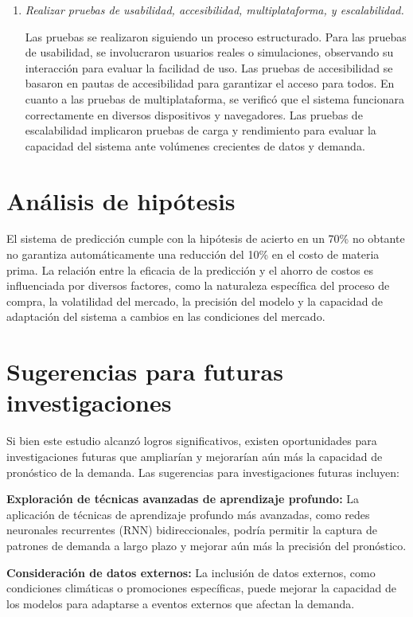 \begin{enumerate}
\item  \emph{Realizar pruebas de usabilidad, accesibilidad, multiplataforma, y escalabilidad.} 

Las pruebas se realizaron siguiendo un proceso estructurado. Para las pruebas de usabilidad, se involucraron usuarios reales o simulaciones, observando su interacción para evaluar la facilidad de uso. Las pruebas de accesibilidad se basaron en pautas de accesibilidad para garantizar el acceso para todos. En cuanto a las pruebas de multiplataforma, se verificó que el sistema funcionara correctamente en diversos dispositivos y navegadores. Las pruebas de escalabilidad implicaron pruebas de carga y rendimiento para evaluar la capacidad del sistema ante volúmenes crecientes de datos y demanda.

\end{enumerate}

\section{Análisis de hipótesis}
El sistema de predicción cumple con la hipótesis de acierto en un 70\% no obtante no garantiza automáticamente una reducción del 10\% en el costo de materia prima. La relación entre la eficacia de la predicción y el ahorro de costos es influenciada por diversos factores, como la naturaleza específica del proceso de compra, la volatilidad del mercado, la precisión del modelo y la capacidad de adaptación del sistema a cambios en las condiciones del mercado.

\section{Sugerencias para futuras investigaciones}
Si bien este estudio alcanzó logros significativos, existen oportunidades para investigaciones futuras que ampliarían y mejorarían aún más la capacidad de pronóstico de la demanda. Las sugerencias para investigaciones futuras incluyen:

\textbf{Exploración de técnicas avanzadas de aprendizaje profundo:} La aplicación de técnicas de aprendizaje profundo más avanzadas, como redes neuronales recurrentes (RNN) bidireccionales, podría permitir la captura de patrones de demanda a largo plazo y mejorar aún más la precisión del pronóstico.

\textbf{Consideración de datos externos:} La inclusión de datos externos, como condiciones climáticas o promociones específicas, puede mejorar la capacidad de los modelos para adaptarse a eventos externos que afectan la demanda.


